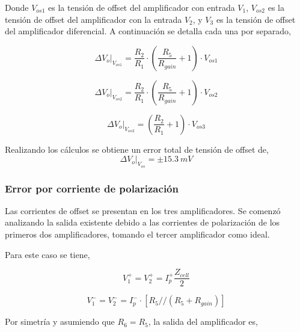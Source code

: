 \documentclass[12pt,A4paper,titlepage]{article}
\begin{document}
\bigskip
\hspace{1mm} Donde \(V_{os1}\) es la tensión de offset del amplificador con entrada \(V_1\), \(V_{os2}\) es la tensión de offset del amplificador con la entrada \(V_2\), y \(V_3\) es la tensión de offset del amplificador diferencial. A continuación se detalla cada una por separado,

\begin{equation}
    \Delta V_o|_{V_{os1}} = \frac{R_2}{R_1} \cdot \left(\frac{R_5}{R_{gain}} + 1\right) \cdot V_{os1}
\end{equation}

\bigskip
\begin{equation}
    \Delta V_o|_{V_{os2}} = \frac{R_2}{R_1} \cdot \left(\frac{R_5}{R_{gain}} + 1\right) \cdot V_{os2}
\end{equation}

\bigskip
\begin{equation}
    \Delta V_o|_{V_{os3}} = \left(\frac{R_2}{R_1} + 1\right) \cdot V_{os3}
\end{equation}

\bigskip
\hspace{1mm} Realizando los cálculos se obtiene un error total de tensión de offset de,
\begin{equation}
    \Delta V_o|_{V_{os}} = \pm 15.3~mV
\end{equation}

\subsubsection{\textbf{Error por corriente de polarización}}
\hspace{1mm} Las corrientes de offset se presentan en los tres amplificadores. Se comenzó analizando la salida existente debido a las corrientes de polarización de los primeros dos amplificadores, tomando el tercer amplificador como ideal.

\bigskip
\hspace{1mm} Para este caso se tiene,

\begin{equation}
    V_1^+ = V_2^+ = I_p^+ \frac{Z_{cell}}{2}
\end{equation}

\begin{equation}
    V_1^- = V_2^- = I_p^- \cdot \left[R_5//(R_5 + R_{gain})\right]
\end{equation}

\bigskip
\hspace{1mm} Por simetría y asumiendo que \(R_6 = R_5\), la salida del amplificador es,
\end{document}
